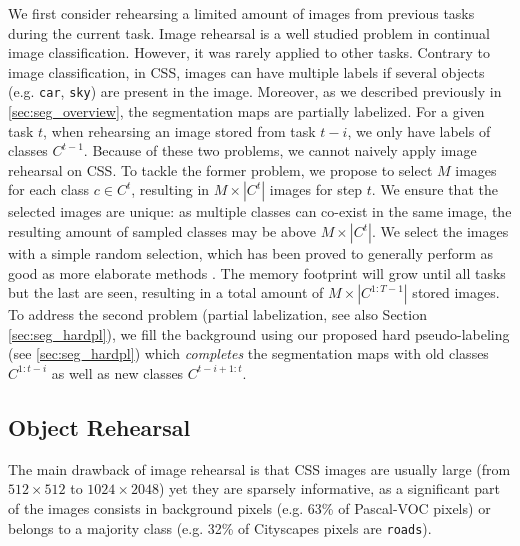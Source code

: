 We first consider rehearsing a limited amount of images from previous tasks during the current task.
Image rehearsal is a well studied problem in continual image classification. However, it was rarely
applied to other tasks. Contrary to image classification, in \ac{CSS}, images can have multiple labels if
several objects (e.g. \texttt{car}, \texttt{sky}) are present in the image. Moreover, as we
described previously in \autoref{sec:seg_overview}, the segmentation maps are partially labelized. For a
given task $t$, when rehearsing an image stored from task $t-i$, we only have labels of classes
$C^{t-1}$. Because of these two problems, we cannot naively apply image rehearsal on \ac{CSS}. To tackle
the former problem, we propose to select $M$ images for each class $c \in C^t$, resulting in $M
    \times |C^t|$ images for step $t$. We ensure that the selected images are unique: as multiple
classes can co-exist in the same image, the resulting amount of sampled classes may be above $M
    \times |C^t|$. We select the images with a simple random selection, which has been proved to
generally perform as good as more elaborate methods \cite{castro2018end_to_end_inc_learn}. The
memory footprint will grow until all tasks but the last are seen, resulting in a total amount of $M
    \times |C^{1:T-1}|$ stored images. To address the second problem (partial labelization, see also
Section \ref{sec:seg_hardpl}), we fill the background using our proposed hard pseudo-labeling (see
\autoref{sec:seg_hardpl}) which \textit{completes} the segmentation maps with old classes
$C^{1:t-i}$ as well as new classes $C^{t-i+1:t}$.

\subsection{Object Rehearsal}
\label{sec:seg_object_rehearsal}

The main drawback of image rehearsal is that \ac{CSS} images are usually large (from $512\times 512$ to
$1024 \times 2048$) yet they are sparsely informative, as a significant part of the images consists
in background pixels \cite{lin2017focalloss} (e.g. 63\% of Pascal-VOC \cite{everingham2015pascalvoc}
pixels) or belongs to a majority class (e.g. 32\% of Cityscapes \cite{cordts2016cityscapes} pixels
are \texttt{roads}).

